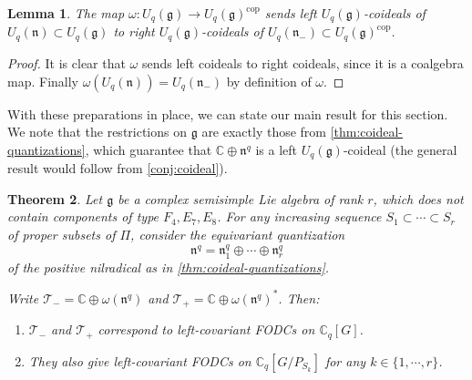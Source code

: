 \documentclass[a4paper, 12pt, reqno, english]{amsart}
\numberwithin{equation}{section}
\numberwithin{figure}{section}
\theoremstyle{plain}
\newtheorem{theorem}{Theorem}[section]
\theoremstyle{plain}
\theoremstyle{plain}
\theoremstyle{plain}
\newtheorem{lemma}[theorem]{Lemma}
\theoremstyle{plain}
\theoremstyle{definition}
\theoremstyle{definition}
\theoremstyle{definition}
\theoremstyle{remark}
\theoremstyle{definition}
\theoremstyle{definition}
\newcommand{\Uqg}{U_q(\mathfrak{g})}
\newcommand{\Uqn}{U_q(\mathfrak{n})}
\newcommand{\Uqnm}{U_q(\mathfrak{n}_-)}
\newcommand{\bbC}{\mathbb{C}}
\newcommand{\lieg}{\mathfrak{g}}
\newcommand{\lien}{\mathfrak{n}}
\newcommand{\simpleroots}{\Pi}
\newcommand{\qnil}{\lien^q}
\newcommand{\Cq}{\mathbb{C}_q}
\newcommand{\tang}{\mathcal{T}}
\begin{document}
\begin{lemma}
The map $\omega: \Uqg \to \Uqg^{\mathrm{cop}}$ sends left $\Uqg$-coideals of $\Uqn \subset \Uqg$ to right $\Uqg$-coideals of $\Uqnm \subset \Uqg^{\mathrm{cop}}$.
\end{lemma}

\begin{proof}
It is clear that $\omega$ sends left coideals to right coideals, since it is a coalgebra map.
Finally $\omega(\Uqn) = \Uqnm$ by definition of $\omega$.
\end{proof}

With these preparations in place, we can state our main result for this section.
We note that the restrictions on $\lieg$ are exactly those from \cref{thm:coideal-quantizations}, which guarantee that $\bbC \oplus \qnil$ is a left $\Uqg$-coideal (the general result would follow from \cref{conj:coideal}).

\begin{theorem}
\label{thm:covariant-fodc}
Let $\lieg$ be a complex semisimple Lie algebra of rank $r$, which does not contain components of type $F_4, E_7, E_8$.
For any increasing sequence $S_1 \subset \cdots \subset S_r$ of proper subsets of $\simpleroots$, consider the equivariant quantization
\[
\qnil = \qnil_1 \oplus \cdots \oplus \qnil_r
\]
of the positive nilradical as in \cref{thm:coideal-quantizations}.

Write $\tang_- = \bbC \oplus \omega(\qnil)$ and $\tang_+ = \bbC \oplus \omega(\qnil)^*$. Then:
\begin{enumerate}
\item $\tang_-$ and $\tang_+$ correspond to left-covariant FODCs on $\Cq[G]$.
\item They also give left-covariant FODCs on $\Cq[G / P_{S_k}]$ for any $k \in \{ 1, \cdots, r \}$.
\end{enumerate}
\end{theorem}
\end{document}
